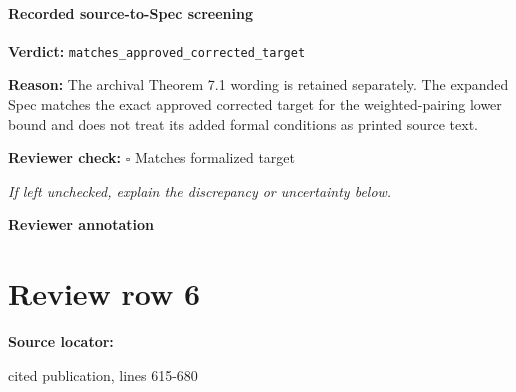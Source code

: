 \documentclass[10pt]{article}
\newcommand{\reviewerbox}{%
  \par\noindent\fbox{\parbox{0.96\linewidth}{\rule{0pt}{0.38in}}}\par
}
\newcommand{\reviewmatch}[1]{%
  \par\noindent\textbf{Reviewer check:} $\square$\; #1\par
  \noindent\emph{If left unchecked, explain the discrepancy or uncertainty below.}\par
}
\begin{document}
\paragraph{Recorded source-to-Spec screening}
\textbf{Verdict:} \texttt{matches\_approved\_corrected\_target}
\\
{\raggedright
\textbf{Reason:} The archival Theorem 7.\allowbreak{}1 wording is retained separately.\allowbreak{} The expanded Spec matches the exact approved corrected target for the weighted-\allowbreak{}pairing lower bound and does not treat its added formal conditions as printed source text.\allowbreak{}
\par}
\reviewmatch{Matches formalized target}
\noindent\textbf{Reviewer annotation}\par
\reviewerbox
\clearpage
\hypertarget{source-claim-d2203fdcdcb5c29a}{}
\section*{Review row 6}
\textbf{Source locator:} {\footnotesize\raggedright cited publication, lines 615-\allowbreak{}680\par}
\end{document}
